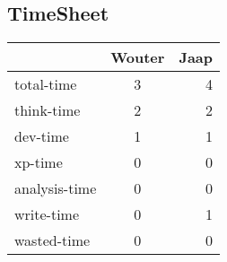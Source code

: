 \subsection{TimeSheet}
\label{time}

\begin{tabular}{ l || c | r }
\hline
  & Wouter & Jaap \\
\hline
  total-time & 3 & 4 \\
\hline
  think-time & 2 & 2 \\
\hline
  dev-time & 1 & 1 \\
\hline
  xp-time & 0 & 0 \\
\hline
  analysis-time & 0 & 0 \\
\hline
  write-time & 0 & 1 \\
\hline
  wasted-time & 0 & 0 \\
\end{tabular}